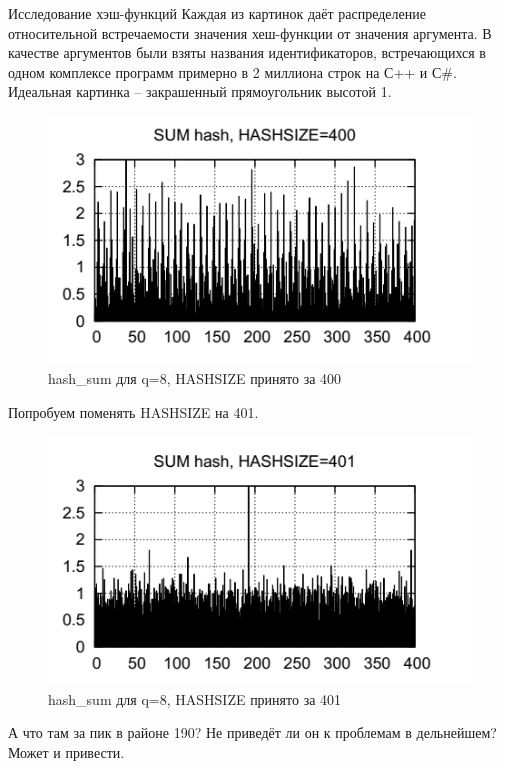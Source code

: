 \documentclass{beamer}
\begin{document}
\begin{frame}[t]{Исследование хэш-функций}
	Каждая из картинок даёт распределение относительной встречаемости значения хеш-функции от значения аргумента. В качестве аргументов были взяты названия идентификаторов, встречающихся в одном комплексе программ примерно в 2 миллиона строк на С++ и С#. Идеальная картинка -- закрашенный прямоугольник высотой 1.
	\begin{figure}[h]
		\centering
		\includegraphics[scale=0.7]{images/lec08-pic03.png}
		\caption{hash\_sum для q=8, HASHSIZE принято за 400}
	\end{figure}
\end{frame}

\begin{frame}[t]
	Попробуем поменять HASHSIZE на 401.
	\begin{figure}[h]
		\centering
		\includegraphics[scale=0.7]{images/lec08-pic04.png}
		\caption{hash\_sum для q=8, HASHSIZE принято за 401}
	\end{figure}
	А что там за пик в районе 190? Не приведёт ли он к проблемам в дельнейшем? Может и привести.
\end{frame}
\end{document}
